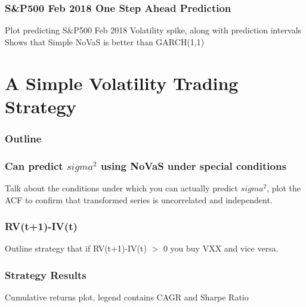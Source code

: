 \documentclass{beamer}
\begin{document}
\begin{frame}
\frametitle{S&P500 Feb 2018 One Step Ahead Prediction}
Plot predicting S&P500 Feb 2018 Volatility spike, along with prediction intervals
Shows that Simple NoVaS is better than GARCH(1,1)
\end{frame}

\section{A Simple Volatility Trading Strategy}

\begin{frame}
\frametitle{Outline}
\tableofcontents[currentsection]
\end{frame}

\begin{frame}
\frametitle{Can predict $sigma^2$ using NoVaS under special conditions}
Talk about the conditions under which you can actually predict $sigma^2$, plot the ACF to confirm that transformed series is uncorrelated and independent.
\end{frame}

\begin{frame}
\frametitle{RV(t+1)-IV(t)}
Outline strategy that if RV(t+1)-IV(t) $>$ 0 you buy VXX and vice versa.
\end{frame}

\begin{frame}
\frametitle{Strategy Results}
Cumulative returns plot, legend contains CAGR and Sharpe Ratio
\end{frame}
\end{document}
